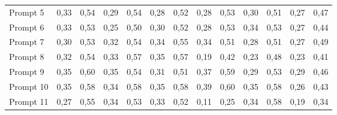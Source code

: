 \begin{tabular}{lrrrrrrrrrrrr}
Prompt 5                                    & 0,33                  & 0,54                    & 0,29                  & 0,54                    & 0,28                  & 0,52                    & 0,28                  & 0,53                    & 0,30                  & 0,51                    & 0,27                  & 0,47                    \\
Prompt 6                                    & 0,33                  & 0,53                    & 0,25                  & 0,50                    & 0,30                  & 0,52                    & 0,28                  & 0,53                    & 0,34                  & 0,53                    & 0,27                  & 0,44                    \\
Prompt 7                                    & 0,30                  & 0,53                    & 0,32                  & 0,54                    & 0,34                  & 0,55                    & 0,34                  & 0,51                    & 0,28                  & 0,51                    & 0,27                  & 0,49                    \\
Prompt 8                                    & 0,32                  & 0,54                    & 0,33                  & 0,57                    & 0,35                  & 0,57                    & 0,19                  & 0,42                    & 0,23                  & 0,48                    & 0,23                  & 0,41                    \\
Prompt 9                                    & 0,35                  & 0,60                    & 0,35                  & 0,54                    & 0,31                  & 0,51                    & 0,37                  & 0,59                    & 0,29                  & 0,53                    & 0,29                  & 0,46                    \\
Prompt 10                                   & 0,35                  & 0,58                    & 0,34                  & 0,58                    & 0,35                  & 0,58                    & 0,39                  & 0,60                    & 0,35                  & 0,58                    & 0,26                  & 0,43                    \\
Prompt 11                                   & 0,27                  & 0,55                    & 0,34                  & 0,53                    & 0,33                  & 0,52                    & 0,11                  & 0,25                    & 0,34                  & 0,58                    & 0,19                  & 0,34                    \\

\end{tabular}
